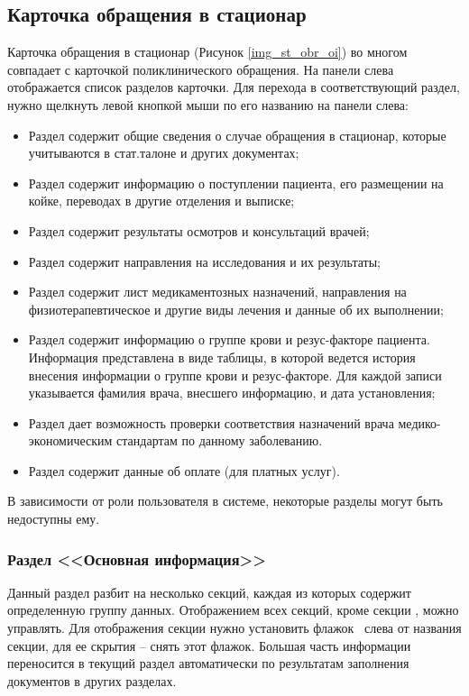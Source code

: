 \subsection{Карточка обращения в стационар} 

Карточка обращения в стационар (Рисунок \ref{img_st_obr_oi}) во многом совпадает с карточкой поликлинического обращения. На панели слева отображается список разделов карточки. Для перехода в соответствующий раздел, нужно щелкнуть левой кнопкой мыши по его названию на панели слева:
\begin{itemize}
 \item Раздел  содержит общие сведения о случае обращения в стационар, которые учитываются в стат.талоне и других документах;
 \item Раздел  содержит информацию о поступлении пациента, его размещении на койке, переводах в другие отделения  и выписке;
 \item Раздел  содержит результаты осмотров и консультаций врачей;
 \item Раздел  содержит направления на исследования и их результаты;
 \item Раздел  содержит лист медикаментозных назначений, направления на физиотерапевтическое и другие виды лечения и данные об их выполнении;
 \item Раздел  содержит информацию о группе крови и резус-факторе пациента. Информация представлена в виде таблицы, в которой ведется история внесения информации о группе крови и резус-факторе. Для каждой записи указывается фамилия врача, внесшего информацию, и дата установления;
 \item Раздел  дает возможность проверки соответствия назначений врача медико-экономическим стандартам по данному заболеванию.
 \item Раздел  содержит данные об оплате (для платных услуг).
\end{itemize}
 
В зависимости от роли пользователя в системе, некоторые разделы могут быть недоступны ему.

\subsubsection{Раздел <<Основная информация>>}

Данный раздел разбит на несколько секций, каждая из которых содержит определенную группу данных. Отображением всех секций, кроме секции , можно управлять. Для отображения секции нужно установить флажок \putx~слева от названия секции, для ее скрытия -- снять этот флажок. Большая часть информации переносится в текущий раздел автоматически по результатам заполнения документов в других разделах.

